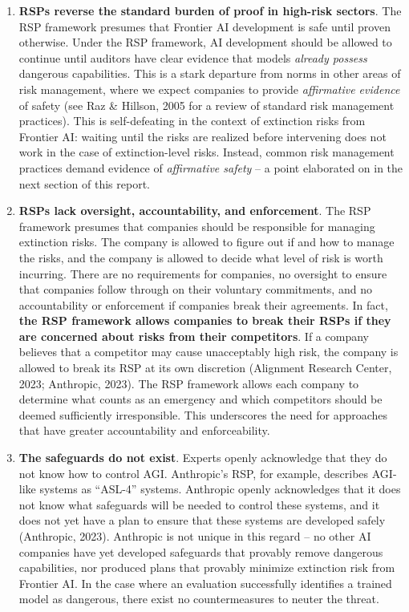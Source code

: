 \documentclass[12pt,a4paper]{article}
\begin{document}
\begin{enumerate}
    \item \textbf{RSPs reverse the standard burden of proof in high-risk sectors}. The RSP framework presumes that Frontier AI development is safe until proven otherwise. Under the RSP framework, AI development should be allowed to continue until auditors have clear evidence that models \textit{already possess} dangerous capabilities. This is a stark departure from norms in other areas of risk management, where we expect companies to provide \textit{affirmative evidence }of safety (see Raz \& Hillson, 2005 for a review of standard risk management practices). This is self-defeating in the context of extinction risks from Frontier AI: waiting until the risks are realized before intervening does not work in the case of extinction-level risks. Instead, common risk management practices demand evidence of \textit{affirmative safety} – a point elaborated on in the next section of this report. 
    \item \textbf{RSPs lack oversight, accountability, and enforcement}. The RSP framework presumes that companies should be responsible for managing extinction risks. The company is allowed to figure out if and how to manage the risks, and the company is allowed to decide what level of risk is worth incurring. There are no requirements for companies, no oversight to ensure that companies follow through on their voluntary commitments, and no accountability or enforcement if companies break their agreements. In fact, \textbf{the RSP framework allows companies to break their RSPs if they are concerned about risks from their competitors}. If a company believes that a competitor may cause unacceptably high risk, the company is allowed to break its RSP at its own discretion (Alignment Research Center, 2023; Anthropic, 2023). The RSP framework allows each company to determine what counts as an emergency and which competitors should be deemed sufficiently irresponsible. This underscores the need for approaches that have greater accountability and enforceability. 
    \item \textbf{The safeguards do not exist}. Experts openly acknowledge that they do not know how to control AGI. Anthropic’s RSP, for example, describes AGI-like systems as “ASL-4” systems. Anthropic openly acknowledges that it does not know what safeguards will be needed to control these systems, and it does not yet have a plan to ensure that these systems are developed safely (Anthropic, 2023). Anthropic is not unique in this regard – no other AI companies have yet developed safeguards that provably remove dangerous capabilities, nor produced plans that provably minimize extinction risk from Frontier AI. In the case where an evaluation successfully identifies a trained model as dangerous, there exist no countermeasures to neuter the threat. 

\end{enumerate}
\end{document}
